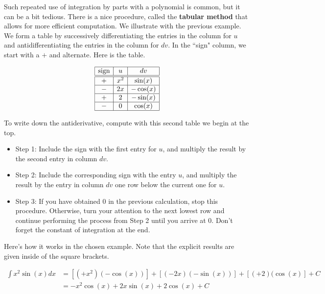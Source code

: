 \documentclass[noauthor]{ximera}
\begin{document}
\begin{remark}
Such repeated use of integration by parts with a polynomial is common, but 
it can be a bit tedious. There is a nice procedure, called the \textbf{tabular 
method} that allows for more efficient computation.  We illustrate with the 
previous example.  We form a table by successively differentiating the entries 
in the column for $u$ and antidifferentiating the entries in the column for $dv$.  
In the ``sign" column, we start with a $+$ and alternate.  Here is the table.

\[
\begin{array}{|c|c|c|}\hline
\text{sign} & u & dv \\ \hline \hline
+ & x^2 & \sin(x) \\ \hline
- & 2x & -\cos(x) \\ \hline
 + & 2  & -\sin(x) \\ \hline
- & 0  & \cos(x) \\ \hline
\end{array}
\]

To write down the antiderivative, compute with this second table we begin at the top. 

\begin{itemize}
\item Step 1: Include the sign with the first entry for $u$, and multiply the result by the second entry in column $dv$.  
\item Step 2: Include the corresponding sign with the entry $u$, and multiply the result by the entry in column $dv$ one row below the current one for $u$.  
\item Step 3: If you have obtained 0 in the previous calculation, stop this procedure. Otherwise, turn your attention to the next lowest row and continue performing the process from Step 2 until you arrive at 0.  Don't forget the constant of integration at the end.
\end{itemize}

Here's how it works in the chosen example.  Note that the explicit results are given inside of the square brackets.

\begin{align*}
\int x^2 \sin(x) dx &= \left[(+x^2)(-\cos(x))\right] + \left[(-2x)(-\sin(x)) \right] +\left[(+2)(\cos(x)\right] + C\\
&= -x^2 \cos(x) +2x\sin(x)+2\cos(x) +C
\end{align*}

\end{remark}
\end{document}

